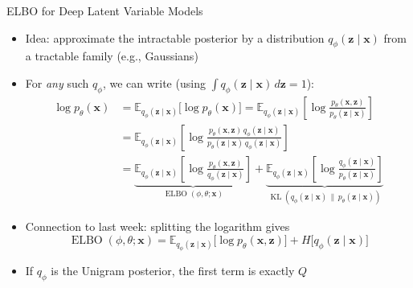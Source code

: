 \documentclass[11pt,compress,t,notes=noshow, xcolor=table]{beamer}
\providecommand{\bx}{\mathbf{x}}
\providecommand{\bz}{\mathbf{z}}
\begin{document}
\begin{frame}{ELBO for Deep Latent Variable Models}

\vfill

\begin{itemize}
\item Idea: approximate the intractable posterior by a distribution $q_\phi(\bz \mid \bx)$ from a tractable family (e.g., Gaussians)
\item For \emph{any} such $q_\phi$, we can write (using $\int q_\phi(\bz \mid \bx)\, d\bz = 1$):
\begin{align*}
\log p_\theta(\bx) &= \mathbb{E}_{q_\phi(\bz \mid \bx)}\big[\log p_\theta(\bx)\big]
= \mathbb{E}_{q_\phi(\bz \mid \bx)}\left[\log \frac{p_\theta(\bx, \bz)}{p_\theta(\bz \mid \bx)}\right]\\
&= \mathbb{E}_{q_\phi(\bz \mid \bx)}\left[\log \frac{p_\theta(\bx, \bz)\, q_\phi(\bz \mid \bx)}{p_\theta(\bz \mid \bx)\, q_\phi(\bz \mid \bx)}\right]\\
&= \underbrace{\mathbb{E}_{q_\phi(\bz \mid \bx)}\left[\log \frac{p_\theta(\bx, \bz)}{q_\phi(\bz \mid \bx)}\right]}_{\operatorname{ELBO}(\phi, \theta; \bx)} + \underbrace{\mathbb{E}_{q_\phi(\bz \mid \bx)}\left[\log \frac{q_\phi(\bz \mid \bx)}{p_\theta(\bz \mid \bx)}\right]}_{\operatorname{KL}(q_\phi(\bz \mid \bx) \,\|\, p_\theta(\bz \mid \bx))}
\end{align*}
\item<2-> Connection to last week: splitting the logarithm gives
\begin{equation*}
\operatorname{ELBO}(\phi, \theta; \bx) = \mathbb{E}_{q_\phi(\bz \mid \bx)}\big[\log p_\theta(\bx, \bz)\big] + H\big[q_\phi(\bz \mid \bx)\big]
\end{equation*}
\item<2-> If $q_\phi$ is the Unigram posterior, the first term is exactly $Q$
\end{itemize}

\vfill

\end{frame}
\end{document}

